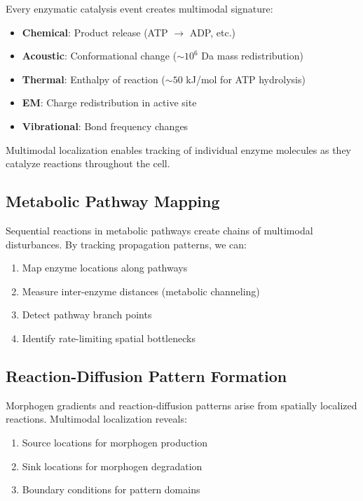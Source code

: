 \documentclass[11pt,a4paper]{article}
\theoremstyle{remark}
\begin{document}
Every enzymatic catalysis event creates multimodal signature:
\begin{itemize}
    \item \textbf{Chemical}: Product release (ATP $\to$ ADP, etc.)
    \item \textbf{Acoustic}: Conformational change ($\sim 10^6$ Da mass redistribution)
    \item \textbf{Thermal}: Enthalpy of reaction ($\sim 50$ kJ/mol for ATP hydrolysis)
    \item \textbf{EM}: Charge redistribution in active site
    \item \textbf{Vibrational}: Bond frequency changes
\end{itemize}

Multimodal localization enables tracking of individual enzyme molecules as they catalyze reactions throughout the cell.

\subsection{Metabolic Pathway Mapping}

Sequential reactions in metabolic pathways create chains of multimodal disturbances. By tracking propagation patterns, we can:
\begin{enumerate}
    \item Map enzyme locations along pathways
    \item Measure inter-enzyme distances (metabolic channeling)
    \item Detect pathway branch points
    \item Identify rate-limiting spatial bottlenecks
\end{enumerate}

\subsection{Reaction-Diffusion Pattern Formation}

Morphogen gradients and reaction-diffusion patterns arise from spatially localized reactions. Multimodal localization reveals:
\begin{enumerate}
    \item Source locations for morphogen production
    \item Sink locations for morphogen degradation
    \item Boundary conditions for pattern domains
\end{enumerate}
\end{document}
